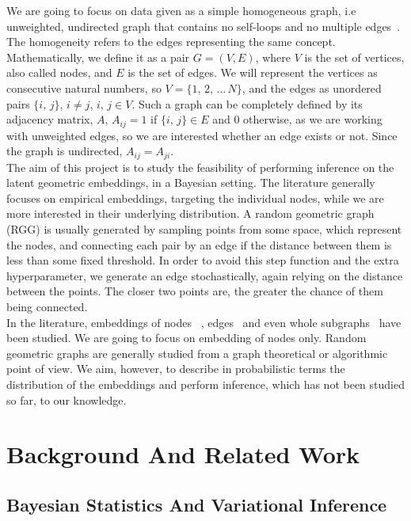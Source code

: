 \documentclass[12pt]{report}
\begin{document}
We are going to focus on data given as a simple homogeneous graph, i.e unweighted, undirected graph that contains no self-loops and no multiple edges~\parencite{simplegraphdef}. The homogeneity refers to the edges representing the same concept. Mathematically, we define it as a pair $G = (V, E)$, where $V$ is the set of vertices, also called nodes, and $E$ is the set of edges. We will represent the vertices as consecutive natural numbers, so $V = \{1,\,2,\,\dots\,N\}$, and the edges as unordered pairs $\{i,\, j\}$, $i \neq j$, $i,\,j \in V$. Such a graph can be completely defined by its adjacency matrix, $A$, $A_{ij} = 1$ if $\{i,\,j\} \in E$ and 0 otherwise, as we are working with unweighted edges, so we are interested whether an edge exists or not. Since the graph is undirected, $A_{ij} = A_{ji}$. \\

The aim of this project is to study the feasibility of performing inference on the latent geometric embeddings, in a Bayesian setting. The literature generally focuses on empirical embeddings, targeting the individual nodes, while we are more interested in their underlying distribution. A random geometric graph (RGG) is usually generated by sampling points from some space, which represent the nodes, and connecting each pair by an edge if the distance between them is less than some fixed threshold. In order to avoid this step function and the extra hyperparameter, we generate an edge stochastically, again relying on the distance between the points. The closer two points are, the greater the chance of them being connected. \\

In the literature, embeddings of nodes~\parencite{word2vec, line, watch} , edges~\parencite{edge2vec, edgeembedd} and even whole subgraphs~\parencite{subrank, sub2vec} have been studied. We are going to focus on embedding of nodes only. Random geometric graphs are generally studied from a graph theoretical or algorithmic point of view. We aim, however, to describe in probabilistic terms the distribution of the embeddings and perform inference, which has not been studied so far, to our knowledge.

\chapter{Background And Related Work}

\section{Bayesian Statistics And Variational Inference}
\end{document}
